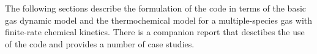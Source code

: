 \documentclass[12pt,a4paper,twoside]{article}
\begin{document}
\medskip 
The following sections describe the formulation of the code in terms of the basic gas dynamic model
and the thermochemical model for a multiple-species gas with finite-rate chemical kinetics.
There is a companion report \cite{jacobs_gollan_2010a} that desctibes the use of the code and provides 
a number of case studies.







\clearpage


\end{document}
